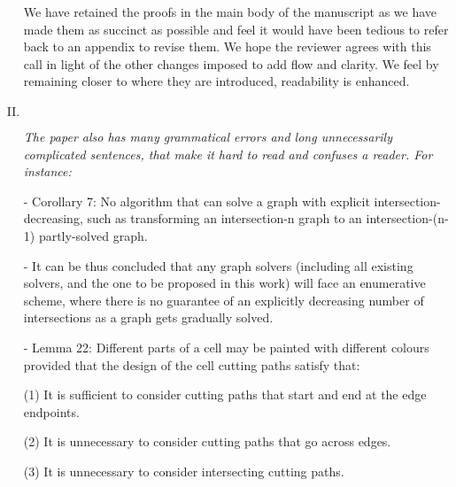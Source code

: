 \documentclass[11pt]{article}
\newenvironment{reviewer}
{\begin{mdframed}[roundcorner = 10pt,fontcolor=blue!70!black]\itshape}
{\end{mdframed}}
\begin{document}
\begin{enumerate}[I.]
We have retained the proofs in the main body of the manuscript as we have made them as succinct as possible and feel it would have been tedious to refer back to an appendix to revise them. We hope the reviewer agrees with this call in light of the other changes imposed to add flow and clarity. We feel by remaining closer to where they are introduced, readability is enhanced.



  \item $ $
  \begin{reviewer}
    The paper also has many grammatical errors and long unnecessarily complicated sentences, that make it hard to read and confuses a reader. For instance: 

- Corollary 7: No algorithm that can solve a graph with explicit intersection-decreasing, such as transforming an intersection-n graph to an intersection-(n-1) partly-solved graph. 

- It can be thus concluded that any graph solvers (including all existing solvers, and the one to be proposed in this work) will face an enumerative scheme, where there is no guarantee of an explicitly decreasing number of intersections as a graph gets gradually solved. 

- Lemma 22: Different parts of a cell may be painted with different colours provided that the design of the cell cutting paths satisfy that: 

\qquad(1) It is sufficient to consider cutting paths that start and end at the edge endpoints.

\qquad(2) It is unnecessary to consider cutting paths that go across edges. 

\qquad(3) It is unnecessary to consider intersecting cutting paths. 
   \end{reviewer}


\end{enumerate}
\end{document}
